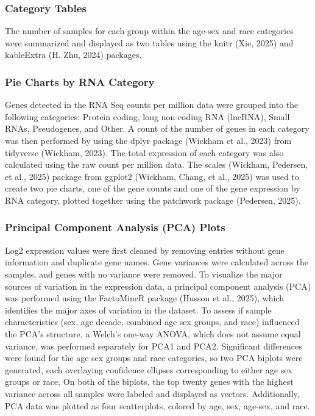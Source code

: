 \documentclass[
  letterpaper,
  DIV=11,
  numbers=noendperiod]{scrartcl}
\begin{document}
\subsubsection{Category Tables}\label{category-tables}

The number of samples for each group within the age-sex and race
categories were summarized and displayed as two tables using the knitr
(Xie, 2025) and kableExtra (H. Zhu, 2024) packages.

\subsubsection{Pie Charts by RNA
Category}\label{pie-charts-by-rna-category}

Genes detected in the RNA Seq counts per million data were grouped into
the following categories: Protein coding, long non-coding RNA (lncRNA),
Small RNAs, Pseudogenes, and Other. A count of the number of genes in
each category was then performed by using the dplyr package (Wickham et
al., 2023) from tidyverse (Wickham, 2023). The total expression of each
category was also calculated using the raw count per million data. The
scales (Wickham, Pedersen, et al., 2025) package from ggplot2 (Wickham,
Chang, et al., 2025) was used to create two pie charts, one of the gene
counts and one of the gene expression by RNA category, plotted together
using the patchwork package (Pedersen, 2025).

\subsubsection{Principal Component Analysis (PCA)
Plots}\label{principal-component-analysis-pca-plots}

Log2 expression values were first cleaned by removing entries without
gene information and duplicate gene names. Gene variances were
calculated across the samples, and genes with no variance were removed.
To visualize the major sources of variation in the expression data, a
principal component analysis (PCA) was performed using the FactoMineR
package (Husson et al., 2025), which identifies the major axes of
variation in the dataset. To assess if sample characteristics (sex, age
decade, combined age sex groups, and race) influenced the PCA's
structure, a Welch's one-way ANOVA, which does not assume equal
variance, was performed separately for PCA1 and PCA2. Significant
differences were found for the age sex groups and race categories, so
two PCA biplots were generated, each overlaying confidence ellipses
corresponding to either age sex groups or race. On both of the biplots,
the top twenty genes with the highest variance across all samples were
labeled and displayed as vectors. Additionally, PCA data was plotted as
four scatterplots, colored by age, sex, age-sex, and race.
\end{document}
